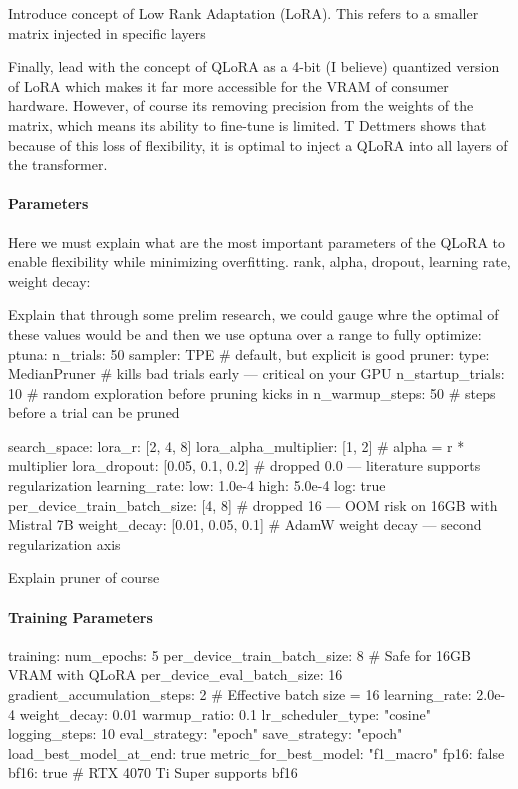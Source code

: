 \documentclass[11pt]{article}
\begin{document}
Introduce concept of Low Rank Adaptation (LoRA). This refers to a smaller matrix injected in specific layers 

Finally, lead with the concept of QLoRA as a 4-bit (I believe) quantized version of LoRA which makes it far more accessible for the VRAM of consumer hardware. However, of course its removing precision from the weights of the matrix, which means its ability to fine-tune is limited. T Dettmers shows that because of this loss of flexibility, it is optimal to inject a QLoRA into all layers of the transformer.

\paragraph{Parameters}
Here we must explain what are the most important parameters of the QLoRA to enable flexibility while minimizing overfitting. rank, alpha, dropout, learning rate, weight decay:

Explain that through some prelim research, we could gauge whre the optimal of these values would be and then we use optuna over a range to fully optimize:
ptuna:
  n_trials: 50
  sampler: TPE               # default, but explicit is good
  pruner: 
    type: MedianPruner       # kills bad trials early — critical on your GPU
    n_startup_trials: 10     # random exploration before pruning kicks in
    n_warmup_steps: 50       # steps before a trial can be pruned

  search_space:
    lora_r: [2, 4, 8]
    lora_alpha_multiplier: [1, 2]       # alpha = r * multiplier
    lora_dropout: [0.05, 0.1, 0.2]     # dropped 0.0 — literature supports regularization
    learning_rate:
      low: 1.0e-4
      high: 5.0e-4
      log: true
    per_device_train_batch_size: [4, 8] # dropped 16 — OOM risk on 16GB with Mistral 7B
    weight_decay: [0.01, 0.05, 0.1]    # AdamW weight decay — second regularization axis

Explain pruner of course

\paragraph{Training Parameters}
training:
  num_epochs: 5
  per_device_train_batch_size: 8   # Safe for 16GB VRAM with QLoRA
  per_device_eval_batch_size: 16
  gradient_accumulation_steps: 2   # Effective batch size = 16
  learning_rate: 2.0e-4
  weight_decay: 0.01
  warmup_ratio: 0.1
  lr_scheduler_type: "cosine"
  logging_steps: 10
  eval_strategy: "epoch"
  save_strategy: "epoch"
  load_best_model_at_end: true
  metric_for_best_model: "f1_macro"
  fp16: false
  bf16: true                     # RTX 4070 Ti Super supports bf16
\end{document}
